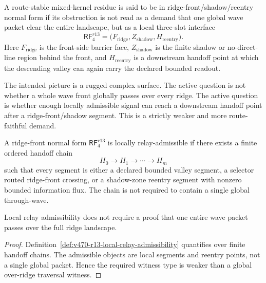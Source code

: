 \begin{definition}
\label{def:v470-r13-ridge-front-reentry-normal-form}
A route-stable mixed-kernel residue is said to be in ridge-front/shadow/reentry
normal form if its obstruction is not read as a demand that one global wave
packet clear the entire landscape, but as a local three-slot interface
\[
\mathsf{RF}_{4}^{r13}
=
\bigl(F_{\mathrm{ridge}},Z_{\mathrm{shadow}},H_{\mathrm{reentry}}\bigr).
\]
Here \(F_{\mathrm{ridge}}\) is the front-side barrier face, \(Z_{\mathrm{shadow}}\)
is the finite shadow or no-direct-line region behind the front, and
\(H_{\mathrm{reentry}}\) is a downstream handoff point at which the descending
valley can again carry the declared bounded readout.
\end{definition}

\begin{remark}
The intended picture is a rugged complex surface.  The active question is not
whether a whole wave front globally passes over every ridge.  The active
question is whether enough locally admissible signal can reach a downstream
handoff point after a ridge-front/shadow segment.  This is a strictly weaker and
more route-faithful demand.
\end{remark}

\begin{definition}
\label{def:v470-r13-local-relay-admissibility}
A ridge-front normal form \(\mathsf{RF}_{4}^{r13}\) is locally relay-admissible
if there exists a finite ordered handoff chain
\[
H_0\to H_1\to\cdots\to H_m
\]
such that every segment is either a declared bounded valley segment, a selector
routed ridge-front crossing, or a shadow-zone reentry segment with nonzero
bounded information flux.  The chain is not required to contain a single global
through-wave.
\end{definition}

\begin{lemma}
\label{lem:v470-r13-no-global-wave-requirement}
Local relay admissibility does not require a proof that one entire wave packet
passes over the full ridge landscape.
\end{lemma}

\begin{proof}
Definition~\ref{def:v470-r13-local-relay-admissibility} quantifies over finite
handoff chains.  The admissible objects are local segments and reentry points,
not a single global packet.  Hence the required witness type is weaker than a
global over-ridge traversal witness.
\end{proof}

